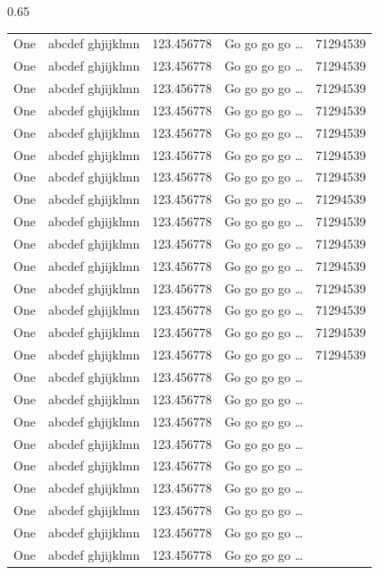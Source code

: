 \documentclass[phd,showframe]{ndsu-thesis-2022}
\begin{document}
\begin{spacing}{0.65}
\begin{longtable}{@{\:} p{1in} p{1.45in} p{1in} p{1.3in} p{1in} @{\:}}
One & abcdef ghjijklmn & 123.456778  & Go go go go \ldots & \num{71294539}\\
One & abcdef ghjijklmn & 123.456778  & Go go go go \ldots & \num{71294539}\\
One & abcdef ghjijklmn & 123.456778  & Go go go go \ldots & \num{71294539}\\
One & abcdef ghjijklmn & 123.456778  & Go go go go \ldots & \num{71294539}\\
One & abcdef ghjijklmn & 123.456778  & Go go go go \ldots & \num{71294539}\\
One & abcdef ghjijklmn & 123.456778  & Go go go go \ldots & \num{71294539}\\
One & abcdef ghjijklmn & 123.456778  & Go go go go \ldots & \num{71294539}\\
One & abcdef ghjijklmn & 123.456778  & Go go go go \ldots & \num{71294539}\\
One & abcdef ghjijklmn & 123.456778  & Go go go go \ldots & \num{71294539}\\
One & abcdef ghjijklmn & 123.456778  & Go go go go \ldots & \num{71294539}\\
One & abcdef ghjijklmn & 123.456778  & Go go go go \ldots & \num{71294539}\\
One & abcdef ghjijklmn & 123.456778  & Go go go go \ldots & \num{71294539}\\
One & abcdef ghjijklmn & 123.456778  & Go go go go \ldots & \num{71294539}\\
One & abcdef ghjijklmn & 123.456778  & Go go go go \ldots & \num{71294539}\\
One & abcdef ghjijklmn & 123.456778  & Go go go go \ldots & \num{71294539}\\
One & abcdef ghjijklmn & 123.456778  & Go go go go \ldots \\
One & abcdef ghjijklmn & 123.456778  & Go go go go \ldots \\
One & abcdef ghjijklmn & 123.456778  & Go go go go \ldots \\
One & abcdef ghjijklmn & 123.456778  & Go go go go \ldots \\
One & abcdef ghjijklmn & 123.456778  & Go go go go \ldots \\
One & abcdef ghjijklmn & 123.456778  & Go go go go \ldots \\
One & abcdef ghjijklmn & 123.456778  & Go go go go \ldots \\
One & abcdef ghjijklmn & 123.456778  & Go go go go \ldots \\
One & abcdef ghjijklmn & 123.456778  & Go go go go \ldots \\

\end{longtable}
\end{spacing}
\end{document}
